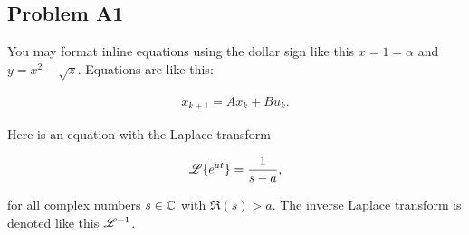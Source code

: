 \subsection{Problem A1}\label{sec:q1}
    You may format inline equations using the dollar sign like this $x = 1 = \alpha$ and $y = x^2 - \sqrt{z}$. Equations are like this:
        
    \begin{align}\label{eq:lti_state_update}
        x_{k+1} = A x_k + Bu_k.
    \end{align}
    
    Here is an equation with the Laplace transform
    
    \begin{equation}
        \mathscr{L} \{e^{at}\} = \frac{1}{s-a},
    \end{equation}
    
    for all complex numbers $s\in\mathbb{C}$ with $\Re(s)>a$. The inverse Laplace transform is denoted like this $\mathscr{L}^{-1}$.
    